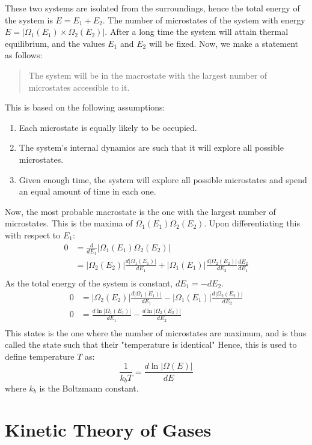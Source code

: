\documentclass[12pt, oneside]{book}
\begin{document}
These two systems are isolated from the surroundings, hence the total energy of the system is \(E = E_1 + E_2\).
The number of microstates of the system with energy \(E = \left| \Omega_1(E_1) \times \Omega_2(E_2) \right| \).
After a long time the system will attain thermal equilibrium, and the values \(E_1\) and \(E_2\) will be fixed.
Now, we make a statement as follows:
\begin{quote}
    The system will be in the macrostate with the largest number of microstates accessible to it.
\end{quote}
This is based on the following assumptions:
\begin{enumerate}
    \item Each microstate is equally likely to be occupied.
    \item The system's internal dynamics are such that it will explore all possible microstates.
    \item Given enough time, the system will explore all possible microstates and spend an equal amount of time in each one.
\end{enumerate}
Now, the most probable macrostate is the one with the largest number of microstates.
This is the maxima of \(\Omega_1(E_1) \Omega_2(E_2)\).
Upon differentiating this with respect to \(E_1\):
\begin{align*}
    0 &= \frac{d}{dE_1} \left| \Omega_1(E_1) \Omega_2(E_2) \right| \\
    &= \left|\Omega_2(E_2)\right| \frac{d\left|\Omega_1(E_1)\right|}{dE_1} + \left|\Omega_1(E_1)\right| \frac{d\left|\Omega_2(E_2)\right|}{dE_2} \frac{dE_2}{dE_1} \\
\end{align*}
As the total energy of the system is constant, \(dE_1 = -dE_2\).
\begin{align*}
    0 &= \left|\Omega_2(E_2)\right| \frac{d\left|\Omega_1(E_1)\right|}{dE_1} - \left|\Omega_1(E_1)\right| \frac{d\left|\Omega_2(E_2)\right|}{dE_2} \\
    0 &= \frac{d\ln\left|\Omega_1(E_1)\right|}{dE_1} - \frac{d\ln\left|\Omega_2(E_2)\right|}{dE_2} \\
\end{align*}
This states is the one where the number of microstates are maximum, and is thus called the state such that their "temperature is identical"
Hence, this is used to define temperature \(T\) as:
\[ \frac{1}{k_b T} = \frac{d\ln\left|\Omega(E)\right|}{dE} \]
where \(k_b\) is the Boltzmann constant.

\chapter{Kinetic Theory of Gases}
\end{document}

